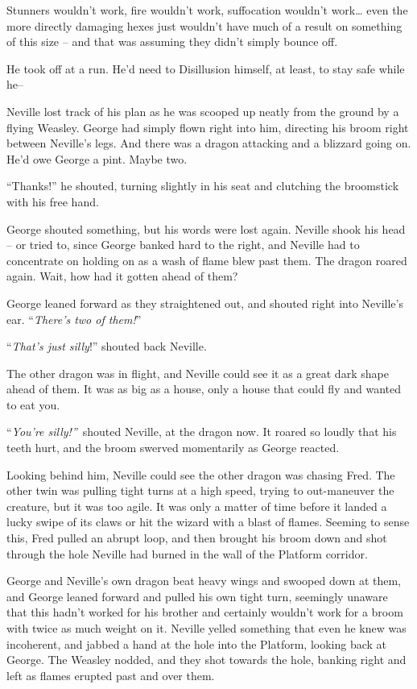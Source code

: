 Stunners wouldn't work, fire wouldn't work, suffocation wouldn't
work\ldots{} even the more directly damaging hexes just wouldn't have
much of a result on something of this size -- and that was assuming they
didn't simply bounce off.

He took off at a run. He'd need to Disillusion himself, at least, to
stay safe while he--

Neville lost track of his plan as he was scooped up neatly from the
ground by a flying Weasley. George had simply flown right into him,
directing his broom right between Neville's legs. And there was a dragon
attacking and a blizzard going on. He'd owe George a pint. Maybe two.

``Thanks!'' he shouted, turning slightly in his seat and clutching the
broomstick with his free hand.

George shouted something, but his words were lost again. Neville shook
his head -- or tried to, since George banked hard to the right, and
Neville had to concentrate on holding on as a wash of flame blew past
them. The dragon roared again. Wait, how had it gotten ahead of them?

George leaned forward as they straightened out, and shouted right into
Neville's ear. ``\emph{There's two of them!}''

``\emph{That's just silly}!'' shouted back Neville.

The other dragon was in flight, and Neville could see it as a great dark
shape ahead of them. It was as big as a house, only a house that could
fly and wanted to eat you.

``\emph{You're silly!''}~shouted Neville, at the dragon now. It roared
so loudly that his teeth hurt, and the broom swerved momentarily as
George reacted.

Looking behind him, Neville could see the other dragon was chasing Fred.
The other twin was pulling tight turns at a high speed, trying to
out-maneuver the creature, but it was too agile. It was only a matter of
time before it landed a lucky swipe of its claws or hit the wizard with
a blast of flames. Seeming to sense this, Fred pulled an abrupt loop,
and then brought his broom down and shot through the hole Neville had
burned in the wall of the Platform corridor.

George and Neville's own dragon beat heavy wings and swooped down at
them, and George leaned forward and pulled his own tight turn, seemingly
unaware that this hadn't worked for his brother and certainly wouldn't
work for a broom with twice as much weight on it. Neville yelled
something that even he knew was incoherent, and jabbed a hand at the
hole into the Platform, looking back at George. The Weasley nodded, and
they shot towards the hole, banking right and left as flames erupted
past and over them.

